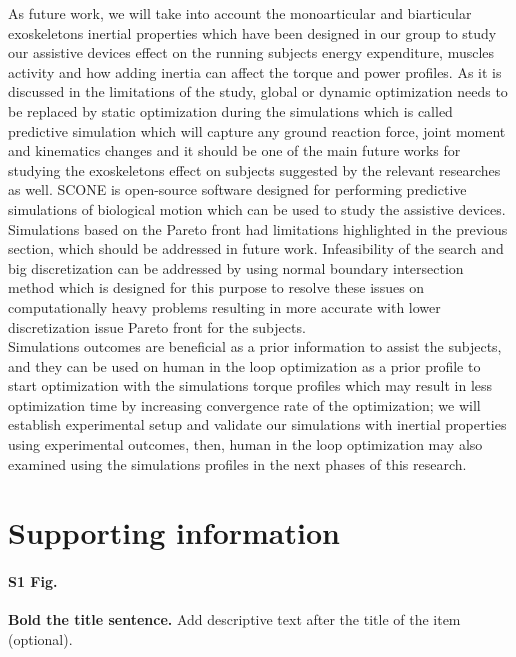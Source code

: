 \documentclass[10pt,letterpaper]{article}
\begin{document}
As future work, we will take into account the monoarticular and biarticular exoskeletons inertial properties which have been designed in our group to study our assistive devices effect on the running subjects energy expenditure, muscles activity and how adding inertia can affect the torque and power profiles. As it is discussed in the limitations of the study, global or dynamic optimization needs to be replaced by static optimization during the simulations which is called predictive simulation \cite{111,112} which will capture any ground reaction force, joint moment and kinematics changes and it should be one of the main future works for studying the exoskeletons effect on subjects suggested by the relevant researches \cite{2,93} as well. SCONE \cite{110} is open-source software designed for performing predictive simulations of biological motion which can be used to study the assistive devices.\\
Simulations based on the Pareto front had limitations highlighted in the previous section, which should be addressed in future work. Infeasibility of the search and big discretization can be addressed by using normal boundary intersection method \cite{108} which is designed for this purpose to resolve these issues on computationally heavy problems resulting in more accurate with lower discretization issue Pareto front for the subjects.\\
Simulations outcomes are beneficial as a prior information to assist the subjects, and they can be used on human in the loop optimization \cite{109} as a prior profile to start optimization with the simulations  torque profiles which may result in less optimization time by increasing convergence rate of the optimization; we will establish experimental setup and validate our simulations with inertial properties using experimental outcomes, then, human in the loop optimization may also examined using the simulations profiles in the next phases of this research.\\
\section*{Supporting information}

\paragraph*{S1 Fig.}
\label{S1_Fig}
{\bf Bold the title sentence.} Add descriptive text after the title of the item (optional).
\end{document}
